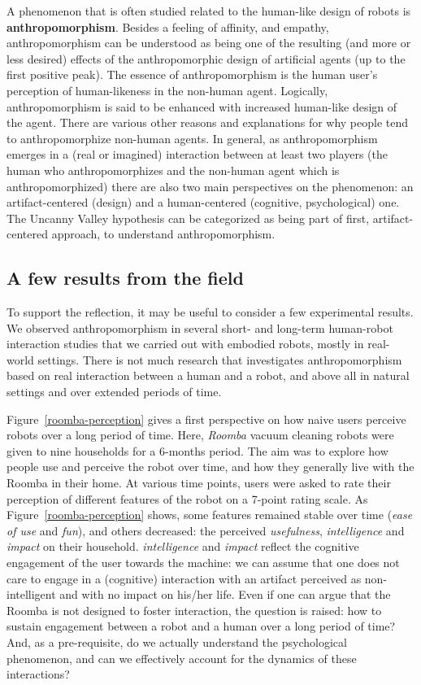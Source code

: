 \documentclass{frontiersSCNS} %
\begin{document}
A phenomenon that is often studied related to the human-like design of robots is
\textbf{anthropomorphism}. Besides a feeling of affinity, and empathy,
anthropomorphism can be understood as being one of the resulting (and  more or
less desired) effects of the anthropomorphic design of artificial agents (up to
the first positive peak). The essence of anthropomorphism is the human user's
perception of human-likeness in the non-human agent. Logically, anthropomorphism
is said to be enhanced with increased human-like design of the agent. There are
various other reasons and explanations for why people tend to anthropomorphize
non-human agents. In general, as anthropomorphism emerges in a (real or
imagined) interaction \citep{persson_anthropomorphism_2000} between at least two
players (the human who anthropomorphizes and the non-human agent which is
anthropomorphized) there are also two main perspectives on the phenomenon: an
artifact-centered (design) and a human-centered (cognitive, psychological) one.
The Uncanny Valley hypothesis can be categorized as being part of first,
artifact-centered approach, to understand anthropomorphism.


\subsection{A few results from the field}

To support the reflection, it may be useful to consider a few experimental
results. We observed anthropomorphism in several short- and long-term human-robot
interaction studies that we carried out with embodied robots, mostly in
real-world settings. There is not much research that investigates
anthropomorphism based on real interaction between a human and a robot, and
above all in natural settings and over extended periods of time. 

Figure~\ref{roomba-perception} gives a first perspective on how naive
users perceive robots over a long period of time. Here, \emph{Roomba} vacuum cleaning robots
were given to nine households for a 6-months period. The aim was to explore how
people use and perceive the robot over time, and how they generally live with
the Roomba in their home. At various time points, users were asked to rate
their perception of different features of the robot on a 7-point rating scale. As
Figure~\ref{roomba-perception} shows, some features remained stable over time
(\emph{ease of use} and \emph{fun}), and others decreased: the perceived
\emph{usefulness}, \emph{intelligence} and \emph{impact} on their household.
\emph{intelligence} and \emph{impact} reflect the cognitive engagement of the
user towards the machine: we can assume that one does not care to engage in a
(cognitive) interaction with an artifact perceived as non-intelligent and with
no impact on his/her life. Even if one can argue that the Roomba is not designed
to foster interaction, the question is raised: how to sustain engagement between
a robot and a human over a long period of time? And, as a pre-requisite, do we
actually understand the psychological phenomenon, and can we effectively account
for the dynamics of these interactions?
\end{document}
